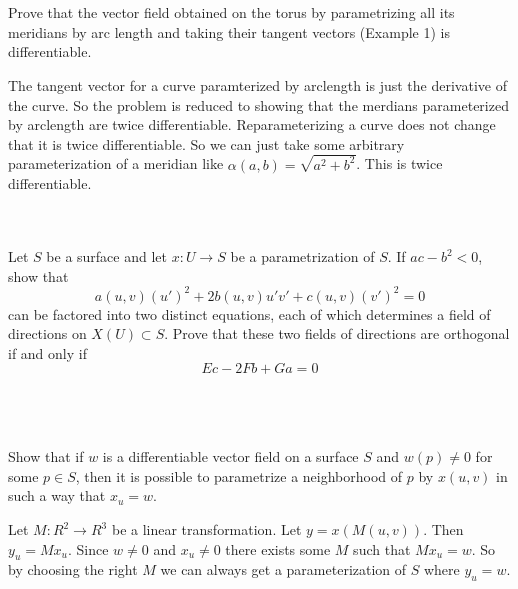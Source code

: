 \documentclass[12pt,letterpaper]{hmcpset}
\begin{document}
\begin{problem}
\\ \\
Prove that the vector field obtained on the torus by parametrizing all its meridians by arc length and taking their tangent vectors (Example 1) is differentiable.\\
\end{problem}
\begin{solution}
  The tangent vector for a curve paramterized by arclength is just the
  derivative of the curve. So the problem is reduced to showing that the
  merdians parameterized by arclength are twice differentiable. Reparameterizing
  a curve does not change that it is twice differentiable. So we can just take
  some arbitrary parameterization of a meridian like $\alpha(a, b) = \sqrt{a^2 +
    b^2}$. This is twice differentiable. 
\end{solution}

\begin{problem}
\\ \\
Let $S$ be a surface and let $x:U\to S$ be a parametrization of $S$. If $ac-b^2 <0$, show that 
$$a(u,v)(u')^2+2b(u,v)u'v'+c(u,v)(v')^2=0$$
can be factored into two distinct equations, each of which determines a field of directions on $X(U)\subset S$. Prove that these two fields of directions are orthogonal if and only if 
$$Ec-2Fb+Ga = 0$$\\
\end{problem}
\begin{solution}
\end{solution}

\begin{problem}
\\ \\
Show that if $w$ is a differentiable vector field on a surface $S$ and $w(p)\neq 0$ for some $p\in S$, then it is possible to parametrize a neighborhood of $p$ by $x(u,v)$ in such a way that $x_u = w$. 
\end{problem}
\begin{solution}
  Let $M: R^2 \rightarrow R^3$ be a linear transformation. Let $y = x(M(u, v))$.
  Then $y_u = Mx_u$. Since $w \neq 0$ and $x_u \neq 0$ there exists some $M$ such that
  $Mx_u = w$. So by choosing the right $M$ we can always get a parameterization
  of $S$ where $y_u = w$.
\end{solution}
\end{document}
